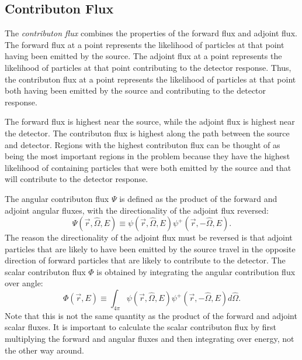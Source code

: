 \subsection{Contributon Flux}
\label{sec:bg:rt:contrib}

The \textit{contributon flux} combines the properties of the forward flux and adjoint flux.
The forward flux at a point represents the likelihood of particles at that point having been emitted by the source.
The adjoint flux at a point represents the likelihood of particles at that point contributing to the detector response.
Thus, the contributon flux at a point represents the likelihood of particles at that point both having been emitted by the source and contributing to the detector response.

The forward flux is highest near the source, while the adjoint flux is highest near the detector.
The contributon flux is highest along the path between the source and detector.
Regions with the highest contributon flux can be thought of as being the most important regions in the problem because they have the highest likelihood of containing particles that were both emitted by the source and that will contribute to the detector response.

The angular contributon flux $\Psi$ is defined as the product of the forward and adjoint angular fluxes, with the directionality of the adjoint flux reversed:
\begin{equation}\label{eq:bg:rt:angular_contributon}
  \Psi\left(\vec{r},\hat{\Omega},E\right) \equiv
  \psi\left(\vec{r},\hat{\Omega},E\right)\psi^+\left(\vec{r},-\hat{\Omega},E\right).
\end{equation}
The reason the directionality of the adjoint flux must be reversed is that adjoint particles that are likely to have been emitted by the source travel in the opposite direction of forward particles that are likely to contribute to the detector.
The scalar contributon flux $\Phi$ is obtained by integrating the angular contribution flux over angle:
\begin{equation}\label{eq:bg:rt:scalar_contributon}
  \Phi\left(\vec{r},E\right) \equiv
  \int_{4\pi}\psi\left(\vec{r},\hat{\Omega},E\right)\psi^+\left(\vec{r},-\hat{\Omega},E\right)d\hat{\Omega}.
\end{equation}
Note that this is not the same quantity as the product of the forward and adjoint scalar fluxes.
It is important to calculate the scalar contributon flux by first multiplying the forward and angular fluxes and then integrating over energy, not the other way around.


